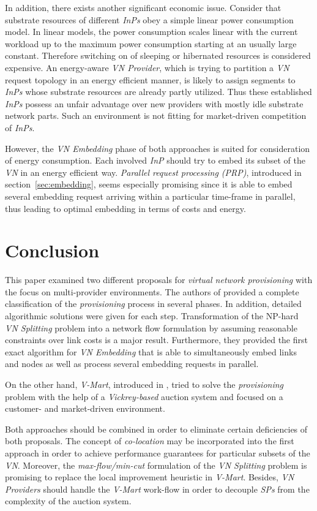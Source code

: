 \documentclass[prodmode,acmtomccap]{acmlarge}
\begin{document}
In addition, there exists another significant economic issue.
Consider that substrate resources of different \emph{InPs} obey a simple linear power consumption model. In linear models, the power consumption scales linear with the current workload up
to the maximum power consumption starting at an usually large constant. Therefore switching on of sleeping or hibernated resources is considered expensive.
An energy-aware \emph{VN Provider}, which is trying to partition a \emph{VN} request topology in an energy efficient manner, is likely
to assign segments to \emph{InPs} whose substrate resources are already partly utilized. Thus these established \emph{InPs} possess an unfair advantage over new 
providers with mostly idle substrate network parts. Such an environment is not fitting for market-driven competition of \emph{InPs}.

However, the \emph{VN Embedding} phase of both approaches is suited for consideration of energy consumption. Each involved \emph{InP} should try to embed
its subset of the \emph{VN} in an energy efficient way. \emph{Parallel request processing (PRP)}, introduced in section~\ref{sec:embedding}, seems especially
promising since it is able to embed several embedding request arriving within a particular time-frame in parallel, thus leading to optimal embedding in terms of costs and energy.
 
 
 \section{Conclusion}
\label{sec:conclusion}
This paper examined two different proposals for \emph{virtual network provisioning} with the focus on multi-provider environments.
The authors of  provided a complete classification of the \emph{provisioning} process in several phases. 
In addition, detailed algorithmic solutions were given for each step. Transformation of the NP-hard \emph{VN Splitting} problem into 
a network flow formulation by assuming reasonable constraints over link costs is a major result. Furthermore, they provided the first
exact algorithm for \emph{VN Embedding} that is able to simultaneously embed links and nodes as well as process several embedding requests in parallel.

On the other hand, \emph{V-Mart}, introduced in , tried to solve the \emph{provisioning} problem with the help of a \emph{Vickrey-based} auction system and 
focused on a customer- and market-driven environment.

Both approaches should be combined in order to eliminate certain deficiencies of both proposals. The concept of \emph{co-location} may be incorporated into the first approach
in order to achieve performance guarantees for particular subsets of the \emph{VN}.
Moreover, the \emph{max-flow/min-cut} formulation of the \emph{VN Splitting} problem is promising to replace the local improvement heuristic in \emph{V-Mart}.
Besides, \emph{VN Providers} should handle the  \emph{V-Mart} work-flow in order to decouple \emph{SPs} from the complexity of the auction system.
\end{document}
